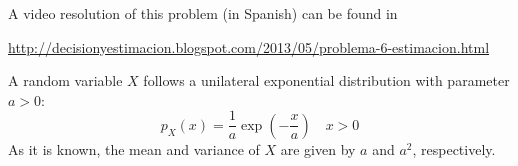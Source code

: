 \begin{solution}
A video resolution of this problem (in Spanish) can be found in
 
\url{http://decisionyestimacion.blogspot.com/2013/05/problema-6-estimacion.html}


\end{solution}

\else

\question A random variable $X$ follows a unilateral exponential distribution with parameter $a>0$:
	 $$p_X(x)=\frac{1}{a}\exp\left(-\frac{x}{a} \right) \quad x>0$$
As it is known, the mean and variance of $X$ are given by $a$ and $a^2$, respectively. 

